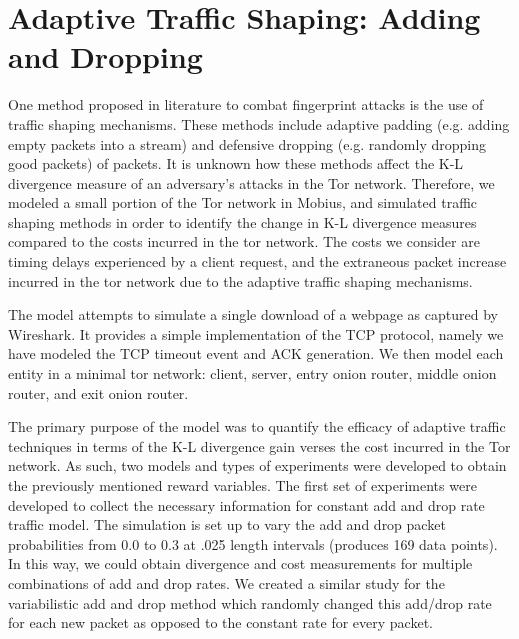 \documentclass{article}
\begin{document}
\section{Adaptive Traffic Shaping: Adding and Dropping}
One method proposed in literature to combat fingerprint attacks is the use 
of traffic shaping mechanisms. These methods include adaptive padding (e.g. 
adding empty packets into a stream) and defensive dropping (e.g. randomly 
dropping good packets) of packets. It is unknown how these methods affect the 
K-L divergence measure of an adversary's attacks in the Tor network. Therefore, 
we modeled a small portion of the Tor network in Mobius, and simulated
traffic shaping methods in order to identify the change in K-L divergence 
measures compared to the costs incurred in the tor network. The costs we 
consider are timing delays experienced by a client request, and the extraneous 
packet increase incurred in the tor network due to the adaptive traffic shaping 
mechanisms. 

The model attempts to simulate a single download of a webpage as captured by 
Wireshark. It provides a simple implementation of the TCP protocol, namely
we have modeled the TCP timeout event and ACK generation. We then model each
entity in a minimal tor network: client, server, entry onion router, middle
onion router, and exit onion router. 

The primary purpose of the model was to quantify the efficacy of adaptive 
traffic techniques 
in terms of the K-L divergence gain verses the cost incurred in the Tor 
network. As such, two models and types of experiments were developed to obtain 
the previously mentioned reward variables. The first set of experiments were 
developed to collect the necessary information for constant add and drop rate
traffic model. The simulation is set up to vary the add and drop packet 
probabilities from 0.0 to 0.3 at .025 length intervals (produces 169 data 
points). In this way, we could 
obtain divergence and cost measurements for multiple combinations of add and 
drop rates. We created a similar study for the variabilistic add and drop 
method which randomly changed this add/drop rate for each new packet as 
opposed to the constant rate for every packet. 
\end{document}

